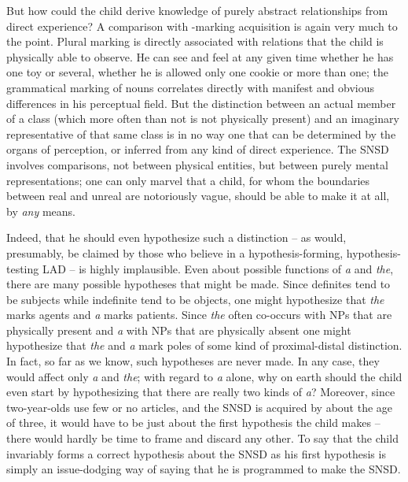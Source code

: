 But how could the child derive knowledge of purely abstract relationships from direct experience? A comparison with -marking acquisition is again very much to the point. Plural marking is directly associated with relations that the child is physically able to observe. He can see and feel at any given time whether he has one toy or several, whether he is allowed only one cookie or more than one; the grammatical marking of nouns correlates directly with manifest and obvious differences in his perceptual field. But the distinction between an actual member of a class (which more often than not is not physically present) and an imaginary representative of that same class is in no way one that can be determined by the organs of perception, or inferred from any kind of direct experience. The SNSD involves comparisons, not between physical entities, but between purely mental representations; one can only marvel that a child, for whom the boundaries between real and unreal are notoriously vague, should be able to make it at all, by \textit{any} means.

Indeed, that he should even hypothesize such a distinction -- as would, presumably, be claimed by those who believe in a hypothesis-forming, hypothesis-testing LAD -- is highly implausible. Even about possible functions of \textit{a} and \textit{the}, there are many possible hypotheses that might be made. Since definites tend to be subjects while indefinite tend to be objects, one might hypothesize that \textit{the} marks agents and
\textit{a} marks patients. Since \textit{the} often co-occurs with NPs that are physically present and \textit{a} with NPs that are physically absent one might hypothesize that \textit{the} and \textit{a} mark poles of some kind of proximal-distal distinction. In fact, so far as we know, such hypotheses are never made. In any case, they would affect only \textit{a} and \textit{the}; with regard to \textit{a} alone, why on earth should the child even start by hypothesizing that there are really two kinds of \textit{a}? Moreover, since two-year-olds use few or no articles, and the SNSD is acquired by about the age of three, it would have to be just about the first hypothesis the child makes -- there would hardly be time to frame and discard any other. To say that the child invariably forms a correct hypothesis about the SNSD as his first hypothesis is simply an issue-dodging way of saying that he is programmed to make the SNSD.

